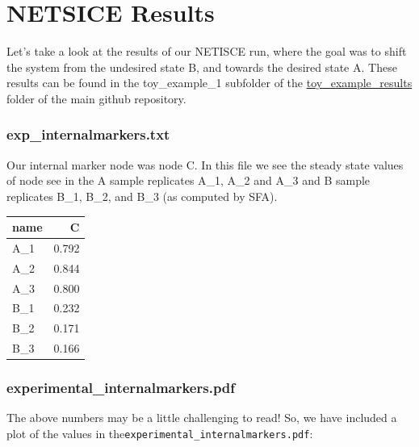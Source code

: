\documentclass[
]{book}
\begin{document}
\hypertarget{netsice-results}{%
\section{NETSICE Results}\label{netsice-results}}

Let's take a look at the results of our NETISCE run, where the goal was to shift the system from the undesired state B, and towards the desired state A. These results can be found in the toy\_example\_1 subfolder of the \href{https://github.com/VeraLiconaResearchGroup/Netisce/tree/main/toy_example_results}{toy\_example\_results} folder of the main github repository.

\hypertarget{section-id}{%
\subsubsection*{exp\_internalmarkers.txt}\label{section-id}}

Our internal marker node was node C. In this file we see the steady state values of node see in the A sample replicates A\_1, A\_2 and A\_3 and B sample replicates B\_1, B\_2, and B\_3 (as computed by SFA).

\begin{tabular}{l|r}
\hline
name & C\\
\hline
A\_1 & 0.792\\
\hline
A\_2 & 0.844\\
\hline
A\_3 & 0.800\\
\hline
B\_1 & 0.232\\
\hline
B\_2 & 0.171\\
\hline
B\_3 & 0.166\\
\hline
\end{tabular}

\hypertarget{section-id}{%
\subsubsection*{experimental\_internalmarkers.pdf}\label{section-id}}

The above numbers may be a little challenging to read! So, we have included a plot of the values in the\texttt{experimental\_internalmarkers.pdf}:
\end{document}
